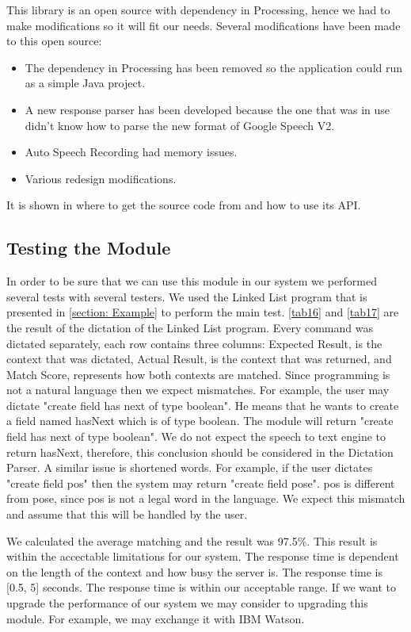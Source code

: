 This library is an open source with dependency in Processing, hence we had to make modifications so it will fit our needs. Several modifications have been made to this open source:
\begin{itemize}
	\item The dependency in Processing has been removed so the application could run as a simple Java project. 
	\item A new response parser has been developed because the one that was in use didn't know how to parse the new format of Google Speech V2.
	\item Auto Speech Recording had memory issues.
	\item Various redesign modifications.
\end{itemize}
It is shown in \citet{getflourish14} where to get the source code from and how to use its API.
\subsection{Testing the Module}
In order to be sure that we can use this module in our system we performed several tests with several testers. We used the Linked List program that is presented in \autoref{section: Example} to perform the main test. \autoref{tab16} and \autoref{tab17} are the result of the dictation of the Linked List program. Every command was dictated separately, each row contains three columns: Expected Result, is the context that was dictated, Actual Result, is the context that was returned, and Match Score, represents how both contexts are matched. Since programming is not a natural language then we expect mismatches. For example, the user may dictate "create field has next of type boolean". He means that he wants to create a field named hasNext which is of type boolean. The module will return "create field has next of type boolean". We do not expect the speech to text engine to return hasNext, therefore, this conclusion should be considered in the Dictation Parser. A similar issue is shortened words. For example, if the user dictates "create field pos" then the system may return "create field pose". pos is different from pose, since pos is not a legal word in the language.  We expect this mismatch and assume that this will be handled by the user.

We calculated the average matching and the result was 97.5\%. This result is within the accectable limitations for our system. The response time is dependent on the length of the context and how busy the server is. The response time is [0.5, 5] seconds. The response time is within our acceptable range. If we want to upgrade the performance of our system we may consider to upgrading this module. For example, we may exchange it with IBM Watson.


